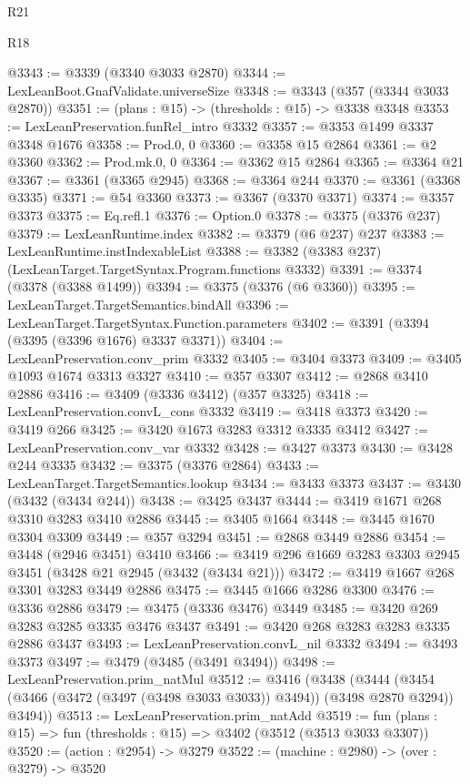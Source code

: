 \begin{lexlean}{R21}
\begin{lexlean}{R18}
\begin{coremodule}
{{{{{{{{{{{{{{{{{{{{{{{{{{{{{{{{{{{{{{{{{{{{{{{{{{{{{{{{{{{{{{{{{{{{{{{{{{{{{{{{{{{{{{{{{{{{{{{{{{{{{{{{{{{{{{{{{{{{{{{{{{{{{{{{{{{{{{{{{{{{{{{@3343 := @3339 (@3340 @3033 @2870)
@3344 := LexLeanBoot.GnafValidate.universeSize
@3348 := @3343 (@357 (@3344 @3033 @2870))
@3351 := (plans : @15) -> (thresholds : @15) -> @3338 @3348
@3353 := LexLeanPreservation.funRel_intro @3332
@3357 := @3353 @1499 @3337 @3348 @1676
@3358 := Prod.{0, 0}
@3360 := @3358 @15 @2864
@3361 := @2 @3360
@3362 := Prod.mk.{0, 0}
@3364 := @3362 @15 @2864
@3365 := @3364 @21
@3367 := @3361 (@3365 @2945)
@3368 := @3364 @244
@3370 := @3361 (@3368 @3335)
@3371 := @54 @3360
@3373 := @3367 (@3370 @3371)
@3374 := @3357 @3373
@3375 := Eq.refl.{1}
@3376 := Option.{0}
@3378 := @3375 (@3376 @237)
@3379 := LexLeanRuntime.index
@3382 := @3379 (@6 @237) @237
@3383 := LexLeanRuntime.instIndexableList
@3388 := @3382 (@3383 @237) (LexLeanTarget.TargetSyntax.Program.functions @3332)
@3391 := @3374 (@3378 (@3388 @1499))
@3394 := @3375 (@3376 (@6 @3360))
@3395 := LexLeanTarget.TargetSemantics.bindAll
@3396 := LexLeanTarget.TargetSyntax.Function.parameters
@3402 := @3391 (@3394 (@3395 (@3396 @1676) @3337 @3371))
@3404 := LexLeanPreservation.conv_prim @3332
@3405 := @3404 @3373
@3409 := @3405 @1093 @1674 @3313 @3327
@3410 := @357 @3307
@3412 := @2868 @3410 @2886
@3416 := @3409 (@3336 @3412) (@357 @3325)
@3418 := LexLeanPreservation.convL_cons @3332
@3419 := @3418 @3373
@3420 := @3419 @266
@3425 := @3420 @1673 @3283 @3312 @3335 @3412
@3427 := LexLeanPreservation.conv_var @3332
@3428 := @3427 @3373
@3430 := @3428 @244 @3335
@3432 := @3375 (@3376 @2864)
@3433 := LexLeanTarget.TargetSemantics.lookup
@3434 := @3433 @3373
@3437 := @3430 (@3432 (@3434 @244))
@3438 := @3425 @3437
@3444 := @3419 @1671 @268 @3310 @3283 @3410 @2886
@3445 := @3405 @1664
@3448 := @3445 @1670 @3304 @3309
@3449 := @357 @3294
@3451 := @2868 @3449 @2886
@3454 := @3448 (@2946 @3451) @3410
@3466 := @3419 @296 @1669 @3283 @3303 @2945 @3451 (@3428 @21 @2945 (@3432 (@3434 @21)))
@3472 := @3419 @1667 @268 @3301 @3283 @3449 @2886
@3475 := @3445 @1666 @3286 @3300
@3476 := @3336 @2886
@3479 := @3475 (@3336 @3476) @3449
@3485 := @3420 @269 @3283 @3285 @3335 @3476 @3437
@3491 := @3420 @268 @3283 @3283 @3335 @2886 @3437
@3493 := LexLeanPreservation.convL_nil @3332
@3494 := @3493 @3373
@3497 := @3479 (@3485 (@3491 @3494))
@3498 := LexLeanPreservation.prim_natMul
@3512 := @3416
    (@3438
      (@3444 (@3454 (@3466 (@3472 (@3497 (@3498 @3033 @3033)) @3494)) (@3498 @2870 @3294)) @3494))
@3513 := LexLeanPreservation.prim_natAdd
@3519 := fun (plans : @15) => fun (thresholds : @15) => @3402 (@3512 (@3513 @3033 @3307))
@3520 := (action : @2954) -> @3279
@3522 := (machine : @2980) -> (over : @3279) -> @3520
}}}}}}}}}}}}}}}}}}}}}}}}}}}}}}}}}}}}}}}}}}}}}}}}}}}}}}}}}}}}}}}}}}}}}}}}}}}}}}}}}}}}}}}}}}}}}}}}}}}}}}}}}}}}}}}}}}}}}}}}}}}}}}}}}}}}}}}}}}}}}}}
\end{coremodule}
\end{lexlean}
\end{lexlean}
